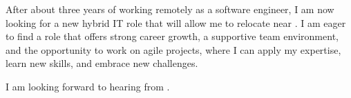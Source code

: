 \documentclass[11pt, a4paper]{awesome-cv}
\begin{document}
\begin{cvletter}
After about three years of working remotely as a software engineer, I am now looking for a new hybrid IT role that will allow me to relocate near \CITY. I am eager to find a role that offers strong career growth, a supportive team environment, and the opportunity to work on agile projects, where I can apply my expertise, learn new skills, and embrace new challenges.

I am looking forward to hearing from \COMPANY. 




\end{cvletter}


\makeletterclosing
\end{document}

